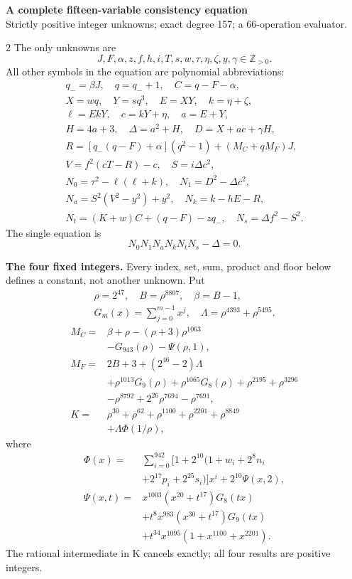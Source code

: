 \documentclass[10pt]{article}
\begin{document}
\begin{center}
{\large\bfseries A complete fifteen-variable consistency equation}\\[-1pt]
{\small Strictly positive integer unknowns; exact degree 157; a 66-operation evaluator.}
\end{center}\vspace{-8pt}
\begin{multicols}{2}
\fontsize{9}{9.5}\selectfont
The only unknowns are
\[
J,F,\alpha,z,f,h,i,T,s,w,\tau,\eta,\zeta,y,\gamma\in\mathbb Z_{>0}.
\]
All other symbols in the equation are polynomial abbreviations:
\[
\begin{gathered}
q_-=\beta J,\quad q=q_-+1,\quad C=q-F-\alpha,\\
X=wq,\quad Y=sq^3,\quad E=XY,\quad k=\eta+\zeta,\\
\ell=EkY,\quad c=kY+\eta,\quad a=E+Y,\\
H=4a+3,\quad\Delta=a^2+H,\quad D=X+ac+\gamma H,\\
R=[q_-(q-F)+\alpha](q^2-1)+(M_C+qM_F)J,\\
V=f^2(cT-R)-c,\quad S=i\Delta c^2,\\
N_0=\tau^2-\ell(\ell+k),\quad N_1=D^2-\Delta c^2,\\
N_a=S^2(V^2-y^2)+y^2,\quad N_k=k-hE-R,\\
N_t=(K+w)C+(q-F)-zq_-,\quad N_s=\Delta f^2-S^2.
\end{gathered}
\]
The single equation is
\[
\boxed{N_0N_1N_aN_kN_tN_s-\Delta=0.}
\]

\textbf{The four fixed integers.}
Every index, set, sum, product and floor below defines a constant, not
another unknown. Put
\[
\begin{gathered}
\rho=2^{47},\quad B=\rho^{8807},\quad\beta=B-1,\\
G_m(x)=\sum_{j=0}^{m-1}x^j,\quad
\Lambda=\rho^{4393}+\rho^{5495}.
\end{gathered}
\]
\begin{align*}
M_C={}&\beta+\rho-(\rho+3)\rho^{1063}\\
&-G_{943}(\rho)-\Psi(\rho,1),\\
M_F={}&2B+3+(2^{46}-2)\Lambda\\
&+\rho^{1013}G_9(\rho)+\rho^{1065}G_8(\rho)
  +\rho^{2195}+\rho^{3296}\\
&-\rho^{8792}+2^{26}\rho^{7694}-\rho^{7691},\\
K={}&\rho^{30}+\rho^{62}+\rho^{1100}+\rho^{2201}+\rho^{8849}\\
&+\Lambda\Phi(1/\rho),
\end{align*}
where
\[
\begin{split}
\Phi(x)={}&\sum_{i=0}^{942}[1+2^{10}(1+w_i+2^8n_i\\
&+2^{17}p_i+2^{25}s_i)]x^i+2^{10}\Psi(x,2),\\
\Psi(x,t)={}&x^{1003}(x^{20}+t^{17})G_8(tx)\\
&+t^8x^{983}(x^{30}+t^{17})G_9(tx)\\
&+t^{34}x^{1095}(1+x^{1100}+x^{2201}).
\end{split}
\]
The rational intermediate in K cancels exactly; all four results are positive integers.


\end{multicols}
\end{document}
